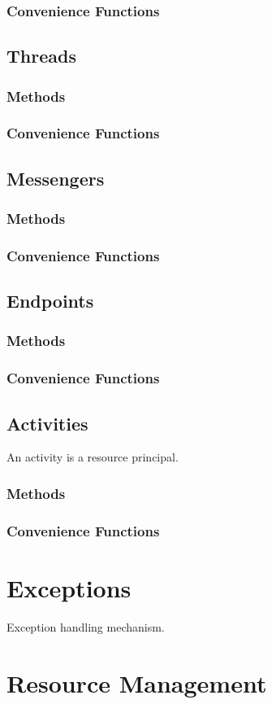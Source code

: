 \subsection{Convenience Functions}

\clearpage
\section{Threads}

\subsection{Methods}

\subsection{Convenience Functions}

\clearpage
\section{Messengers}

\subsection{Methods}

\subsection{Convenience Functions}

\clearpage
\section{Endpoints}

\subsection{Methods}

\subsection{Convenience Functions}

\clearpage
\section{Activities}

An activity is a resource principal.

\subsection{Methods}

\subsection{Convenience Functions}

\chapter{Exceptions}

Exception handling mechanism.

\chapter{Resource Management}
